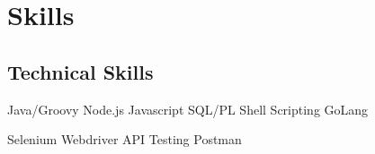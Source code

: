 \documentclass[]{openfont}
\begin{document}
\begin{minipage}[t]{0.33\textwidth}





\section{Skills}
\subsection{Technical Skills}

\textbullet{}Java/Groovy
\textbullet{}Node.js
\textbullet{}Javascript
\textbullet{}SQL/PL
\textbullet{}Shell Scripting
\textbullet{}GoLang

\textbullet{}Selenium 
\textbullet{}Webdriver
\textbullet{}API Testing
\textbullet{}Postman


\end{minipage}
\end{document}
